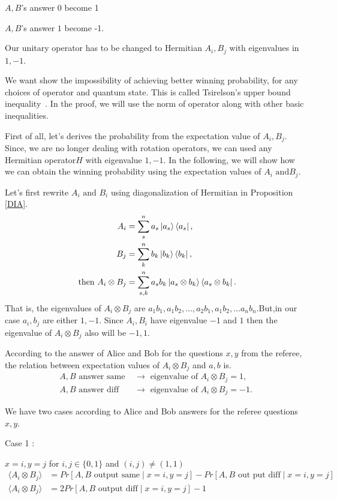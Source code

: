 $A,B$'s  answer $0$ become 1

$A,B$'s answer $1$ become -1.



Our unitary operator has to be changed to Hermitian $A_i,B_j$ with eigenvalues in $1,-1$.

We want show the impossibility of achieving better  winning probability, for any choices of operator and quantum state. This is called Tsirelson’s  upper bound inequality~\citep*{Cirel'son1980}.
In the proof, we will use the norm of operator along with other basic inequalities.


First of all, let's derives the probability from the expectation value of $A_i,B_j$. Since, we are no longer dealing with rotation operators, we can used any Hermitian  operator$H$ with eigenvalue $1,-1$. In the following, we will show how we can obtain the winning probability using the expectation values of $A_i\text{ and} B_j$.

Let's first rewrite $A_i\text{ and } B_i$ using  diagonalization of Hermitian in Proposition \ref{DIA}.
\begin{align}\label{NEED}
A_i&=\sum_s^n a_s \ket{a_s}\bra{a_s},\nonumber\\
B_j&=\sum_k^n  b_k \ket{b_k}\bra{b_k},\nonumber\\
\text{  then } A_i\otimes B_j&=\sum_{s,k}^n  a_s b_k \ket{a_s\otimes b_k}\bra{a_s \otimes b_k}.
\end{align}
That is, the eigenvalues of $A_i\otimes B_j$ are $a_1 b_1 ,a_1b_2,\dots,a_2 b_1,a_1 b_2,\ldots a_n b_n$.But,in our case $a_i,b_j$ are either $1,-1$. Since $A_i, B_i$  have eigenvalue $-1$ and $1$ then the eigenvalue of $A_i\otimes B_j$ also will be $-1,1$.

According to the answer of Alice and Bob for the questions $x,y$ from the referee, the relation between expectation values of $A_i\otimes B_j$ and $a,b$ is.
 \begin{align}
 A,B \text{ answer same }&\rightarrow \text{  eigenvalue of } A_i\otimes B_j=1\label{ae1},\\
 A,B \text{ answer diff }&\rightarrow \text{  eigenvalue of } A_i\otimes B_j=-1\label{ae2}.
 \end{align}
 

We have two cases according to Alice and Bob answers for the referee questions $x,y$.

Case 1 :

$x=i,y=j$ for $i,j\in \{0,1\}$ and $(i,j)\neq (1,1)$
\begin{align}
\langle A_i\otimes B_j \rangle&=Pr[A,B \text{ output same} \mid  x=i,y=j]-Pr[A,B \text{ out put diff}  \mid  x=i,y=j]\\
\langle A_i\otimes B_j\rangle &=2Pr[A,B \text{ output diff} \mid  x=i,y=j]-1
\end{align}

